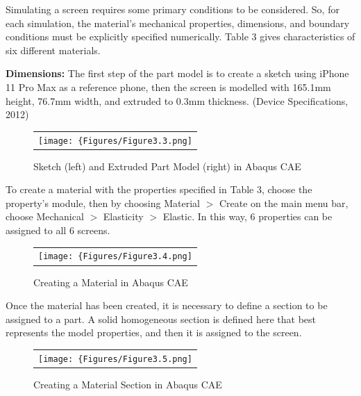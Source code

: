 \documentclass[a4paper,12pt]{article}
\numberwithin{equation}{section}
\numberwithin{figure}{section}
\begin{document}
\noindent Simulating a screen requires some primary conditions to be considered. So, for each simulation, the material's mechanical properties, dimensions, and boundary conditions must be explicitly specified numerically. Table 3 gives characteristics of six different materials.\vspace{\baselineskip}

\noindent \textbf{Dimensions:} The first step of the part model is to create a sketch using iPhone 11 Pro Max as a reference phone, then the screen is modelled with 165.1mm height, 76.7mm width, and extruded to 0.3mm thickness. (Device Specifications, 2012)\vspace{\baselineskip}

\begin{figure}[H]
  \centering
  \begin{tabular}{@{}c@{}}
    \texttt{[image: \{Figures/Figure3.3.png]}} \\
  \end{tabular}
  \caption {Sketch (left) and Extruded Part Model (right) in Abaqus CAE}
\end{figure}

\noindent To create a material with the properties specified in Table 3, choose the property’s module, then by choosing Material $>$ Create on the main menu bar, choose Mechanical $>$ Elasticity $>$ Elastic. In this way, 6 properties can be assigned to all 6 screens.

\begin{figure}[H]
  \centering
  \begin{tabular}{@{}c@{}}
    \texttt{[image: \{Figures/Figure3.4.png]}} \\
  \end{tabular}
  \caption {Creating a Material in Abaqus CAE}
\end{figure}

\noindent Once the material has been created, it is necessary to define a section to be assigned to a part. A solid homogeneous section is defined here that best represents the model properties, and then it is assigned to the screen.\vspace{\baselineskip}

\begin{figure}[H]
  \centering
  \begin{tabular}{@{}c@{}}
    \texttt{[image: \{Figures/Figure3.5.png]}} \\
  \end{tabular}
  \caption {Creating a Material Section in Abaqus CAE}
\end{figure}
\end{document}
